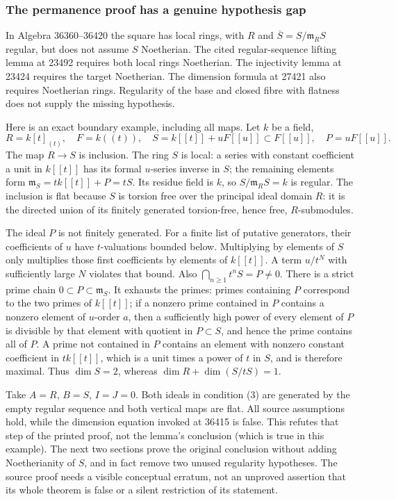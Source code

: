 \subsubsection{The permanence proof has a genuine hypothesis gap}\label{the-permanence-proof-has-a-genuine-hypothesis-gap}

In Algebra 36360--36420 the square has local rings, with \(R\) and \(\overline S=S/\mathfrak m_RS\) regular, but does not assume \(S\) Noetherian. The cited regular-sequence lifting lemma at 23492 requires both local rings Noetherian. The injectivity lemma at 23424 requires the target Noetherian. The dimension formula at 27421 also requires Noetherian rings. Regularity of the base and closed fibre with flatness does not supply the missing hypothesis.

Here is an exact boundary example, including all maps. Let \(k\) be a field, \[
R=k[t]_{(t)},\quad F=k((t)),\quad
S=k[[t]]+uF[[u]]\subset F[[u]],\quad P=uF[[u]].
\] The map \(R\to S\) is inclusion. The ring \(S\) is local: a series with constant coefficient a unit in \(k[[t]]\) has its formal \(u\)-series inverse in \(S\); the remaining elements form \(\mathfrak m_S=tk[[t]]+P=tS\). Its residue field is \(k\), so \(S/\mathfrak m_RS=k\) is regular. The inclusion is flat because \(S\) is torsion free over the principal ideal domain \(R\): it is the directed union of its finitely generated torsion-free, hence free, \(R\)-submodules.

The ideal \(P\) is not finitely generated. For a finite list of putative generators, their coefficients of \(u\) have \(t\)-valuations bounded below. Multiplying by elements of \(S\) only multiplies those first coefficients by elements of \(k[[t]]\). A term \(u/t^N\) with sufficiently large \(N\) violates that bound. Also \(\bigcap_{n\geq1}t^nS=P\ne0\). There is a strict prime chain \(0\subset P\subset\mathfrak m_S\). It exhausts the primes: primes containing \(P\) correspond to the two primes of \(k[[t]]\); if a nonzero prime contained in \(P\) contains a nonzero element of \(u\)-order \(a\), then a sufficiently high power of every element of \(P\) is divisible by that element with quotient in \(P\subset S\), and hence the prime contains all of \(P\). A prime not contained in \(P\) contains an element with nonzero constant coefficient in \(tk[[t]]\), which is a unit times a power of \(t\) in \(S\), and is therefore maximal. Thus \(\dim S=2\), whereas \(\dim R+\dim(S/tS)=1\).

Take \(A=R\), \(B=S\), \(I=J=0\). Both ideals in condition (3) are generated by the empty regular sequence and both vertical maps are flat. All source assumptions hold, while the dimension equation invoked at 36415 is false. This refutes that step of the printed proof, not the lemma's conclusion (which is true in this example). The next two sections prove the original conclusion without adding Noetherianity of \(S\), and in fact remove two unused regularity hypotheses. The source proof needs a visible conceptual erratum, not an unproved assertion that its whole theorem is false or a silent restriction of its statement.

